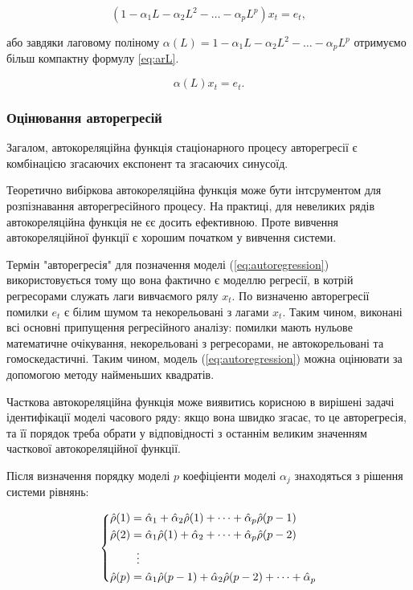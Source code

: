 $$
(1 - \alpha_{1}L - \alpha_{2}L^{2} - \dots - \alpha_{p}L^{p})x_{t} = e_{t},
$$

\noindent або завдяки лаговому поліному $\alpha(L) = 1 - \alpha_{1}L - \alpha_{2}L^{2} - \dots - \alpha_{p}L^{p}$ отримуємо більш компактну формулу \ref{eq:arL}.

\begin{equation}\label{eq:arL}
\alpha(L)x_{t} = e_{t}.
\end{equation}

\subsubsection{Оцінювання авторегресій}

Загалом,  автокореляційна функція стаціонарного процесу авторегресії є комбінацією згасаючих експонент та згасаючих синусоїд.

Теоретично вибіркова автокореляційна функція може бути інтсрументом для розпізнавання авторегресійного процесу. На практиці, для невеликих рядів автокореляційна функція не єє досить ефективною. Проте вивчення автокореляційної функції є хорошим початком у вивчення системи.

Термін "авторегресія" для позначення моделі (\ref{eq:autoregression}) використовується тому що вона фактично є моделлю регресії, в котрій регресорами служать лаги вивчаємого рялу $x_{t}$. По визначеню авторегресії помилки $e_{t}$ є білим шумом та некорельовані з лагами $x_{t}$. Таким чином, виконані всі основні припущення регресійного аналізу: помилки мають нульове математичне очікування, некорельовані з регресорами, не автокорельовані та гомоскедастичні. Таким чином, модель (\ref{eq:autoregression}) можна оцінювати за допомогою методу найменьших квадратів.

Часткова автокореляційна функція може виявитись корисною в вирішені задачі ідентифікації моделі часового ряду: якщо вона швидко згасає, то це авторегресія, та її порядок треба обрати у відповідності з останнім великим значенням часткової автокореляційної функції.

Після визначення порядку моделі $p$ коефіціенти моделі $\alpha_{j}$ знаходяться з рішення системи рівнянь:

\[
	\left\{
	\begin{aligned}
	\hat{\rho}(1) &= \hat{\alpha}_{1} + \hat{\alpha}_{2}\hat{\rho}(1) + \dots + \hat{\alpha}_{p}\hat{\rho}(p-1) \\
	\hat{\rho}(2) &= \hat{\alpha}_{1}\hat{\rho}(1) + \hat{\alpha}_{2} + \dots + \hat{\alpha}_{p}\hat{\rho}(p-2) \\
	&\;\;\vdots \notag \\
	\hat{\rho}(p) &= \hat{\alpha}_{1}\hat{\rho}(p-1) + \hat{\alpha}_{2}\hat{\rho}(p-2) + \dots + \hat{\alpha}_{p} \\
	\end{aligned}
	\right.
\]

